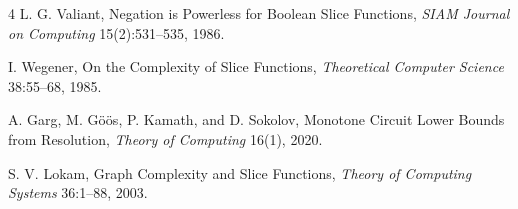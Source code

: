 \documentclass[11pt]{article}
\begin{document}
\begin{thebibliography}{4}
L. G. Valiant, Negation is Powerless for Boolean Slice Functions, \emph{SIAM Journal on Computing} 15(2):531--535, 1986.

I. Wegener, On the Complexity of Slice Functions, \emph{Theoretical Computer Science} 38:55--68, 1985.

A. Garg, M. G\"o\"os, P. Kamath, and D. Sokolov,
Monotone Circuit Lower Bounds from Resolution,
\emph{Theory of Computing} 16(1), 2020.

S. V. Lokam,
Graph Complexity and Slice Functions,
\emph{Theory of Computing Systems} 36:1--88, 2003.
\end{thebibliography}
\end{document}
